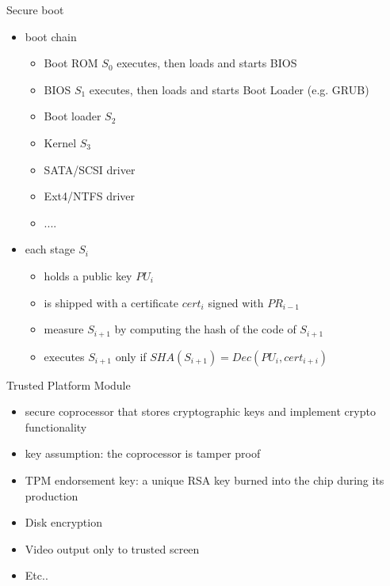 \documentclass{beamer}
\begin{document}
\begin{frame}{Secure boot}
  \begin{itemize}
  \item boot chain
    \begin{itemize}
      \item Boot ROM $S_0$ executes, then loads and starts BIOS
      \item BIOS $S_1$ executes, then loads and starts Boot Loader
        (e.g. GRUB)
      \item Boot loader $S_2$
      \item Kernel $S_3$
      \item SATA/SCSI driver
      \item Ext4/NTFS driver
      \item ....
    \end{itemize}
   \item<2-> each stage $S_i$
     
     \begin{itemize}
       \item holds a public key $PU_i$
       \item is shipped with a certificate $cert_{i}$
         signed with $PR_{i-1}$
       \item measure $S_{i+1}$ by computing the hash of the
         code of $S_{i+1}$
       \item executes $S_{i+1}$ only if $SHA(S_{i+1}) = Dec(PU_i, cert_{i+i})$
     \end{itemize}
  \end{itemize}
\end{frame}



\begin{frame}{Trusted Platform Module}
  \begin{itemize}
  \item secure coprocessor that stores cryptographic keys and
    implement crypto functionality
  \item key assumption: the coprocessor is tamper proof
  \item TPM endorsement key: a unique RSA key burned into the chip
    during its production
  \item Disk encryption
  \item Video output only to trusted screen 
  \item Etc..
  \end{itemize}
\end{frame}
\end{document}
